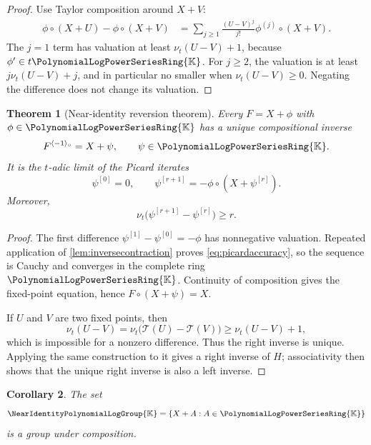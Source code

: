 \documentclass[11pt,oneside,openany]{book}
\newtheorem{theorem}{Theorem}[chapter]
\newtheorem{corollary}[theorem]{Corollary}
\newcommand{\K}{\mathbb{K}}
\newcommand{\Rring}{\PolynomialLogPowerSeriesRing{\K}}
\newcommand{\Ggroup}{\NearIdentityPolynomialLogGroup{\K}}
\newcommand{\ordt}{\nu_t}
\newcommand{\compose}{\mathbin{\circ}}
\newcommand{\rev}{^{\langle-1\rangle_{\circ}}}
\begin{document}
\begin{proof}
Use Taylor composition around \(X+V\):
\begin{align*}
 \phi\compose(X+U)-\phi\compose(X+V)
 &=\sum_{j\geq1}
   \frac{(U-V)^j}{j!}
   \phi^{(j)}\compose(X+V).
\end{align*}
The \(j=1\) term has valuation at least
\(\ordt(U-V)+1\), because \(\phi'\in t\Rring\).  For \(j\geq2\), the valuation
is at least \(j\ordt(U-V)+j\), and in particular no smaller when
\(\ordt(U-V)\geq0\).  Negating the difference does not change its valuation.
\end{proof}

\begin{theorem}[Near-identity reversion theorem]\label{thm:nearidinverse}
Every \(F=X+\phi\) with \(\phi\in\Rring\) has a unique compositional inverse
\[
 F\rev=X+\psi,
 \qquad \psi\in\Rring.
\]
It is the \(t\)-adic limit of the Picard iterates
\begin{equation}\label{eq:picardinverse}
 \psi^{[0]}=0,
 \qquad
 \psi^{[r+1]}=-\phi\compose(X+\psi^{[r]}).
\end{equation}
Moreover,
\begin{equation}\label{eq:picardaccuracy}
 \ordt\bigl(\psi^{[r+1]}-\psi^{[r]}\bigr)\geq r.
\end{equation}
\end{theorem}

\begin{proof}
The first difference \(\psi^{[1]}-\psi^{[0]}=-\phi\) has nonnegative
valuation.  Repeated application of \cref{lem:inversecontraction} proves
\cref{eq:picardaccuracy}, so the sequence is Cauchy and converges in the
complete ring \(\Rring\).  Continuity of composition gives the fixed-point
equation, hence \(F\compose(X+\psi)=X\).

If \(U\) and \(V\) are two fixed points, then
\[
 \ordt(U-V)=\ordt\bigl(\mathcal{T}(U)-\mathcal{T}(V)\bigr)
 \geq\ordt(U-V)+1,
\]
which is impossible for a nonzero difference.  Thus the right inverse is
unique.  Applying the same construction to it gives a right inverse of \(H\);
associativity then shows that the unique right inverse is also a left inverse.
\end{proof}

\begin{corollary}\label{cor:Gisgroup}
The set
\[
 \Ggroup=\{X+A:A\in\Rring\}
\]
is a group under composition.
\end{corollary}
\end{document}

